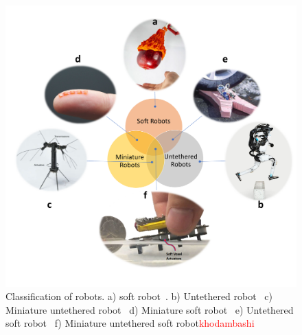 \begin{figure}[!ht]
      \centering
      \includegraphics[width=\textwidth]{venn.pdf}
      \caption{Classification of robots. a) soft robot~\cite{Li2019}. b) Untethered robot~ c) Miniature untethered robot~\cite{Jafferis2019} d) Miniature soft robot~\cite{Tingting2012} e) Untethered soft robot~\cite{Tolley2014d} f) Miniature untethered soft robot\textcolor{red}{khodambashi~\cite{}}}
      \label{fig:venn}
\end{figure}

